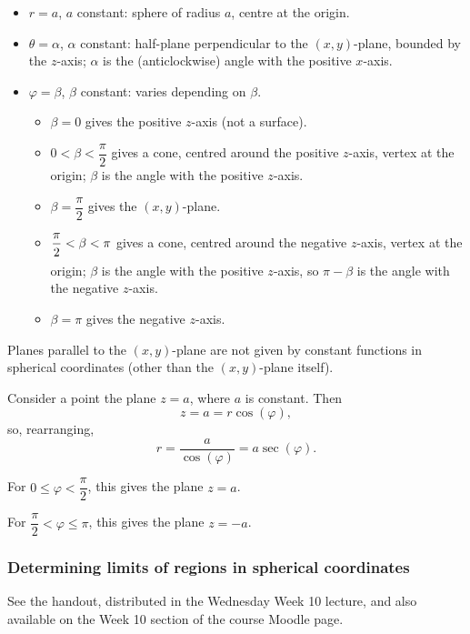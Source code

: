   \begin{itemize}
    \item $r = a$, $a$ constant: sphere of radius $a$, centre at the origin.
    \item $\theta = \alpha$, $\alpha$ constant: half-plane perpendicular to the $(x, y)$-plane, bounded by the $z$-axis; $\alpha$ is the (anticlockwise) angle with the positive $x$-axis.
    \item $\varphi = \beta$, $\beta$ constant: varies depending on $\beta$.
      \begin{itemize}
        \item $\beta = 0$ gives the positive $z$-axis (not a surface).
        \item $0 < \beta < \dfrac{\pi}{2}$ gives a cone, centred around the positive $z$-axis, vertex at the origin; $\beta$ is the angle with the positive $z$-axis.
        \item $\beta = \dfrac{\pi}{2}$ gives the $(x, y)$-plane.
        \item $\dfrac{\pi}{\strut 2} < \beta < \pi$ gives a cone, centred around the negative $z$-axis, vertex at the origin; $\beta$ is the angle with the positive $z$-axis, so $\pi - \beta$ is the angle with the negative $z$-axis.
        \item $\beta = \pi$ gives the negative $z$-axis.
      \end{itemize}
  \end{itemize}
  
  Planes parallel to the $(x, y)$-plane are not given by constant functions in spherical coordinates (other than the $(x, y)$-plane itself).
  
  Consider a point the plane $z = a$, where $a$ is constant.  Then
    \[
      z = a = r\cos(\varphi),
    \]
  so, rearranging,
    \[
      r = \frac{a}{\cos(\varphi)} = a\sec(\varphi).
    \]
  
  For $0 \leq \varphi < \dfrac{\pi}{2}$, this gives the plane $z = a$.
  
  For $\dfrac{\pi}{2} < \varphi \leq \pi$, this gives the plane $z = - a$.
  
  \subsubsection*{Determining limits of regions in spherical coordinates}
  
  See the handout, distributed in the Wednesday Week 10 lecture, and also available on the Week 10 section of the course Moodle page.
  
